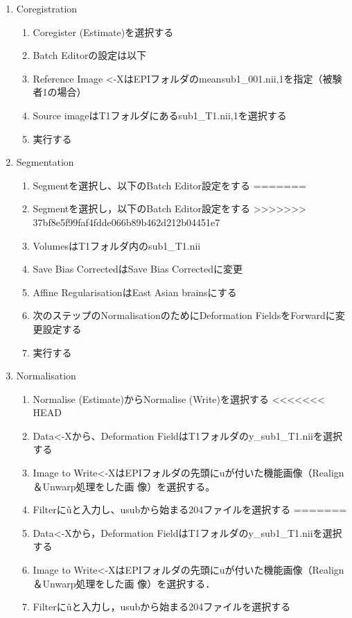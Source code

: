 \documentclass{jlreq}
\begin{document}
\begin{enumerate}
\begin{enumerate}
\begin{enumerate}
\begin{enumerate}
    \item Coregistration
    \begin{enumerate}
        \item Coregister (Estimate)を選択する
        \item Batch Editorの設定は以下
        \item Reference Image <-XはEPIフォルダのmeansub1\_001.nii,1を指定（被験者1の場合）
        \item Source imageはT1フォルダにあるsub1\_T1.nii,1を選択する
        \item 実行する
    \end{enumerate}
    \item Segmentation
    \begin{enumerate}
<<<<<<< HEAD
        \item Segmentを選択し、以下のBatch Editor設定をする
=======
        \item Segmentを選択し，以下のBatch Editor設定をする
>>>>>>> 37bf8e5f99faf4fdde066b89b462d212b04451e7
        \item VolumesはT1フォルダ内のsub1\_T1.nii
        \item Save Bias CorrectedはSave Bias Correctedに変更
        \item Affine RegularisationはEast Asian brainsにする
        \item 次のステップのNormalisationのためにDeformation FieldsをForwardに変更設定する
        \item 実行する
    \end{enumerate}
    \item Normalisation
    \begin{enumerate}
        \item Normalise (Estimate)からNormalise (Write)を選択する
<<<<<<< HEAD
        \item Data<-Xから、Deformation FieldはT1フォルダのy\_sub1\_T1.niiを選択する
        \item Image to Write<-XはEPIフォルダの先頭にuが付いた機能画像（Realign＆Unwarp処理をした画
        像）を選択する。
        \item Filterに\^uと入力し、usubから始まる204ファイルを選択する
=======
        \item Data<-Xから，Deformation FieldはT1フォルダのy\_sub1\_T1.niiを選択する
        \item Image to Write<-XはEPIフォルダの先頭にuが付いた機能画像（Realign＆Unwarp処理をした画
        像）を選択する．
        \item Filterに\^uと入力し，usubから始まる204ファイルを選択する

\end{enumerate}
\end{enumerate}
\end{enumerate}
\end{enumerate}
\end{enumerate}
\end{document}
